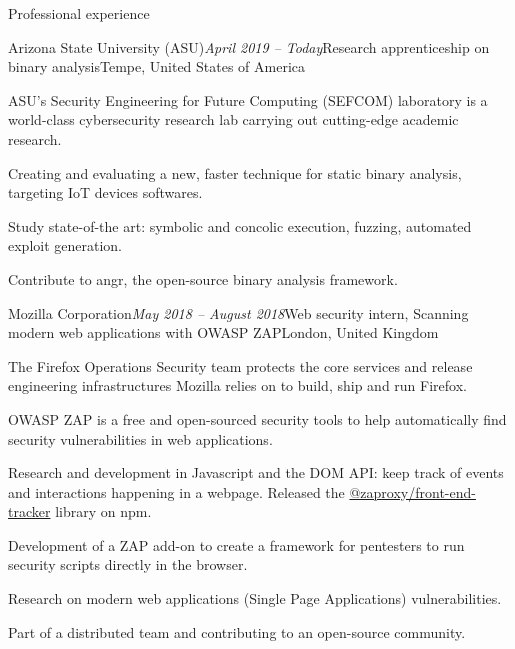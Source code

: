\begin{rSection}{Professional experience}
  \begin{rSubsection}{Arizona State University (ASU)}{\em April 2019 -- Today}{Research apprenticeship on binary analysis}{Tempe, United States of America}
    \item[]
      ASU's Security Engineering for Future Computing (SEFCOM) laboratory is a world-class cybersecurity research lab carrying out cutting-edge academic research.
    \item Creating and evaluating a new, faster technique for static binary analysis, targeting IoT devices softwares.
    \item Study state-of-the art: symbolic and concolic execution, fuzzing, automated exploit generation.
    \item Contribute to angr, the open-source binary analysis framework.
  \end{rSubsection}


  \begin{rSubsection}{Mozilla Corporation}{\em May 2018 -- August 2018}{Web security intern, Scanning modern web applications with OWASP ZAP}{London, United Kingdom}
    \item[]
      The Firefox Operations Security team protects the core services and release engineering infrastructures Mozilla relies on to build, ship and run Firefox.
    \item[]
      OWASP ZAP is a free and open-sourced security tools to help automatically find security vulnerabilities in web applications.

    \item Research and development in Javascript and the DOM API: keep track of events and interactions happening in a webpage. Released the \href{https://www.npmjs.com/package/@zaproxy/front-end-tracker}{@zaproxy/front-end-tracker} library on npm.
    \item Development of a ZAP add-on to create a framework for pentesters to run security scripts directly in the browser.
    \item Research on modern web applications (Single Page Applications) vulnerabilities.
    \item Part of a distributed team and contributing to an open-source community.
  \end{rSubsection}


\end{rSection}
